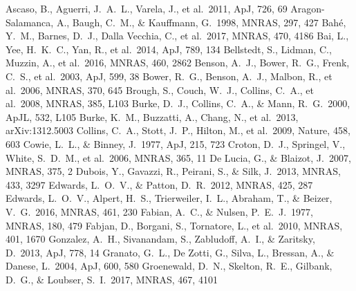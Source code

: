 \documentclass[
12pt, %
spanish,
singlespacing, %
headsepline, %
]{MastersDoctoralThesis} %
\def\apj {ApJ}
\def\apjl {ApJL}
\def\mnras {MNRAS}
\def\apj {ApJ}
\def\nat {Nature}
\begin{document}
\begin{thebibliography}{X}
    Ascaso, B., Aguerri, J.~A.~L., Varela, J., et al.\ 2011, \apj, 726, 69 
    Aragon-Salamanca, A., Baugh, C.~M., \& Kauffmann, G.\ 1998, \mnras, 297, 427 
    Bah{\'e}, Y.~M., Barnes, D.~J., Dalla Vecchia, C., et al.\ 2017, \mnras, 470, 4186 
    Bai, L., Yee, H.~K.~C., Yan, R., et al.\ 2014, \apj, 789, 134 
    Bellstedt, S., Lidman, C., Muzzin, A., et al.\ 2016, \mnras, 460, 2862 
    Benson, A.~J., Bower, R.~G., Frenk, C.~S., et al.\ 2003, \apj, 599, 38 
    Bower, R.~G., Benson, A.~J., Malbon, R., et al.\ 2006, \mnras, 370, 645 
    Brough, S., Couch, W.~J., Collins, C.~A., et al.\ 2008, \mnras, 385, L103 
    Burke, D.~J., Collins, C.~A., \& Mann, R.~G.\ 2000, \apjl, 532, L105 
    Burke, K.~M., Buzzatti, A., Chang, N., et al.\ 2013, arXiv:1312.5003 
    Collins, C.~A., Stott, J.~P., Hilton, M., et al.\ 2009, \nat, 458, 603 
    Cowie, L.~L., \& Binney, J.\ 1977, \apj, 215, 723 
    Croton, D.~J., Springel, V., White, S.~D.~M., et al.\ 2006, \mnras, 365, 11 
    De Lucia, G., \& Blaizot, J.\ 2007, \mnras, 375, 2 
    Dubois, Y., Gavazzi, R., Peirani, S., \& Silk, J.\ 2013, \mnras, 433, 3297 
    Edwards, L.~O.~V., \& Patton, D.~R.\ 2012, \mnras, 425, 287 
    Edwards, L.~O.~V., Alpert, H.~S., Trierweiler, I.~L., Abraham, T., \& Beizer, V.~G.\ 2016, \mnras, 461, 230 
    Fabian, A.~C., \& Nulsen, P.~E.~J.\ 1977, \mnras, 180, 479 
    Fabjan, D., Borgani, S., Tornatore, L., et al.\ 2010, \mnras, 401, 1670 
    Gonzalez, A.~H., Sivanandam, S., Zabludoff, A.~I., \& Zaritsky, D.\ 2013, \apj, 778, 14 
    Granato, G.~L., De Zotti, G., Silva, L., Bressan, A., \& Danese, L.\ 2004, \apj, 600, 580 
    Groenewald, D.~N., Skelton, R.~E., Gilbank, D.~G., \& Loubser, S.~I.\ 2017, \mnras, 467, 4101 

\end{thebibliography}
\end{document}
